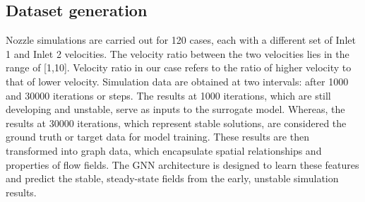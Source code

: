 \subsection{Dataset generation}
Nozzle simulations are carried out for 120 cases, each with a different set of Inlet 1 and Inlet 2 velocities. The velocity ratio between the two velocities lies in the range of [1,10]. Velocity ratio in our case refers to the ratio of higher velocity to that of lower velocity.
Simulation data are obtained at two intervals: after 1000 and 30000 iterations or steps. The results at 1000 iterations, which are still developing and unstable, serve as inputs to the surrogate model. Whereas, the results at 30000 iterations, which represent stable solutions, are considered the ground truth or target data for model training. These results are then transformed into graph data, which encapsulate spatial relationships and properties of flow fields. The GNN architecture is designed to learn these features and predict the stable, steady-state fields from the early, unstable simulation results.
